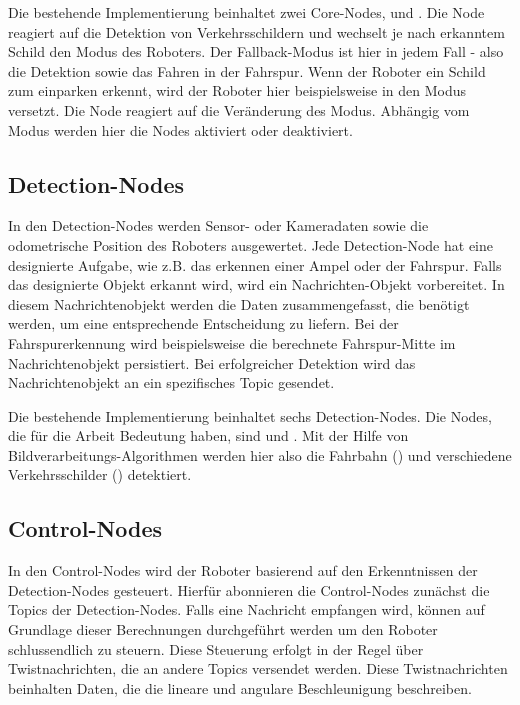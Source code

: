 Die bestehende Implementierung beinhaltet zwei Core-Nodes,  und . Die Node  reagiert auf die
Detektion von Verkehrsschildern und wechselt je nach erkanntem Schild den Modus des Roboters. Der Fallback-Modus ist hier in jedem Fall  - also die Detektion sowie das 
Fahren in der Fahrspur. Wenn der Roboter ein Schild zum einparken erkennt, wird der Roboter hier beispielsweise in den Modus  versetzt. 
Die Node  reagiert auf die Veränderung des Modus. Abhängig vom Modus werden hier die Nodes aktiviert oder deaktiviert. 

\subsection{Detection-Nodes}
In den Detection-Nodes werden Sensor- oder Kameradaten sowie die odometrische Position des Roboters ausgewertet. Jede Detection-Node hat eine designierte Aufgabe, wie z.B. das erkennen einer Ampel oder der Fahrspur. Falls das designierte
Objekt erkannt wird, wird ein Nachrichten-Objekt vorbereitet. In diesem Nachrichtenobjekt werden die Daten zusammengefasst, die benötigt werden, um eine entsprechende Entscheidung zu liefern.
Bei der Fahrspurerkennung wird beispielsweise die berechnete Fahrspur-Mitte im Nachrichtenobjekt persistiert. Bei erfolgreicher Detektion wird das Nachrichtenobjekt an ein spezifisches Topic gesendet.

Die bestehende Implementierung beinhaltet sechs Detection-Nodes. Die Nodes, die für die Arbeit Bedeutung haben, sind  und . Mit der Hilfe von Bildverarbeitungs-Algorithmen
werden hier also die Fahrbahn () und verschiedene Verkehrsschilder () detektiert.

\subsection{Control-Nodes}
In den Control-Nodes wird der Roboter basierend auf den Erkenntnissen der Detection-Nodes gesteuert. Hierfür abonnieren die Control-Nodes zunächst die Topics der Detection-Nodes.
Falls eine Nachricht empfangen wird, können auf Grundlage dieser Berechnungen durchgeführt werden um den Roboter schlussendlich zu steuern. Diese Steuerung erfolgt in der Regel über
Twistnachrichten, die an andere Topics versendet werden. Diese Twistnachrichten beinhalten Daten, die die lineare und angulare Beschleunigung beschreiben.

